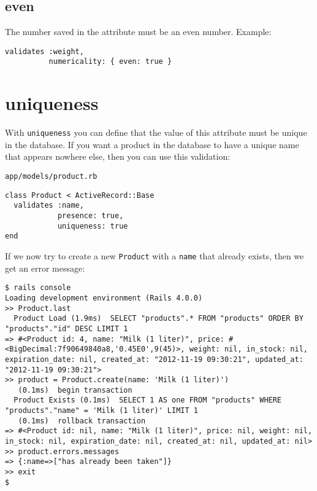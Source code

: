 \documentclass[a4paper]{book}
\newcounter{tab}[chapter]
\begin{document}
\subsection{even}\label{even}

The number saved in the attribute must be an even number. Example:

\begin{shaded}\begin{verbatim}
validates :weight,
          numericality: { even: true }
\end{verbatim}\end{shaded}

\section{uniqueness}\label{uniqueness}

With \texttt{uniqueness} you can define that the value of this attribute must be unique in the database. If you want a product in the database to have a unique name that appears nowhere else, then you can use this validation:

\texttt{app/models/product.rb}

\begin{shaded}\begin{verbatim}
class Product < ActiveRecord::Base
  validates :name,
            presence: true,
            uniqueness: true
end
\end{verbatim}\end{shaded}

If we now try to create a new \texttt{Product} with a \texttt{name} that already exists, then we get an error message:

\begin{shaded}\begin{verbatim}
$ rails console
Loading development environment (Rails 4.0.0)
>> Product.last
  Product Load (1.9ms)  SELECT "products".* FROM "products" ORDER BY "products"."id" DESC LIMIT 1
=> #<Product id: 4, name: "Milk (1 liter)", price: #<BigDecimal:7f90649840a8,'0.45E0',9(45)>, weight: nil, in_stock: nil, expiration_date: nil, created_at: "2012-11-19 09:30:21", updated_at: "2012-11-19 09:30:21">
>> product = Product.create(name: 'Milk (1 liter)')
   (0.1ms)  begin transaction
  Product Exists (0.1ms)  SELECT 1 AS one FROM "products" WHERE "products"."name" = 'Milk (1 liter)' LIMIT 1
   (0.1ms)  rollback transaction
=> #<Product id: nil, name: "Milk (1 liter)", price: nil, weight: nil, in_stock: nil, expiration_date: nil, created_at: nil, updated_at: nil>
>> product.errors.messages
=> {:name=>["has already been taken"]}
>> exit
$
\end{verbatim}\end{shaded}
\end{document}
